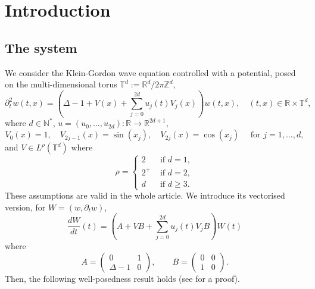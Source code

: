 \documentclass[a4paper]{article}
\theoremstyle{plain}
\newcommand{\T}{\mathbb{T}}
\newcommand{\R}{\mathbb{R}}
\begin{document}







\section{Introduction}

\subsection{The system}

We consider the Klein-Gordon wave equation controlled with a potential, posed on the multi-dimensional torus $\T^d:=\R^d/2\pi \mathbb{Z}^d$, 
\begin{equation}\label{eq:wave_bis}
{\partial^2_t}w(t,x)=\left(\Delta-1+V(x)+\sum_{j=0}^{2d}u_j(t)V_j(x)\right)w(t,x),\quad (t,x)\in \mathbb{R} \times \mathbb{T}^d,
\end{equation}
where 
$d \in \mathbb{N}^*$,
$u=(u_0,\dots,u_{2d}):\mathbb{R} \to \mathbb{R}^{2d+1}$,
\begin{equation}\label{eq:cos-sin_bis}
V_0(x)=1, \quad V_{2j-1}(x)=\sin(x_j), \quad V_{2j}(x)=\cos(x_j) \quad \text{ for } j=1,\dots,d,
\end{equation}
and $V \in L^{\rho}(\T^d)$ where
\begin{equation} \label{def:q_rho}
\rho = \left\lbrace \begin{array}{ll}
2 & \text{ if } d=1, \\
2^+ & \text{ if } d=2, \\
d & \text{ if } d \geq 3.
\end{array}\right.
\end{equation}
These assumptions are valid in the whole article.
We introduce its vectorised version, for $W=(w,\partial_t w)$,
\begin{equation} \label{wave_vect}
\frac{dW}{dt}(t)=\left( A+VB+\sum_{j=0}^{2d} u_j(t) V_j B \right) W(t)
\end{equation}
where
\begin{equation} \label{def:B}
A=\begin{pmatrix}
    0 & 1 \\ \Delta-1 & 0
\end{pmatrix},
\qquad
B=\begin{pmatrix}
    0 & 0 \\ 1 & 0
\end{pmatrix}.
\end{equation}
Then, the following well-posedness result holds (see  for a proof).
\end{document}
